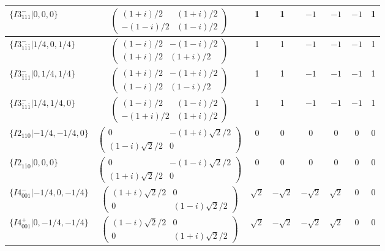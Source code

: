 \documentclass[3p,preprint]{elsarticle}
\begin{document}
\begin{table}[H]
{\begin{tabular}{|l|c||c|c|c|c|c|c|}
			$\{I3^{-}_{111}|0,0,0\}$ &		$\left(\begin{array}{cc} (1+i)/2&(1+i)/2 \\ -(1-i)/2&(1-i)/2 \end{array}\right)$	&1 & 1 & $-1$ & $-1$ & $-1$ & 1 \\ \hline
			$\{I3^{-}_{1\bar{1}\bar{1}}|1/4,0,1/4\}$ &		$\left(\begin{array}{cc} (1-i)/2&-(1-i)/2 \\ (1+i)/2&(1+i)/2 \end{array}\right)$	&1 & 1 & $-1$ & $-1$ & $-1$ & 1 \\ \hline
			$\{I3^{-}_{\bar{1}\bar{1}1}|0,1/4,1/4\}$ &		$\left(\begin{array}{cc} (1+i)/2&-(1+i)/2 \\ (1-i)/2&(1-i)/2 \end{array}\right)$	&1 & 1 & $-1$ & $-1$ & $-1$ & 1 \\ \hline
			$\{I3^{-}_{\bar{1}1\bar{1}}|1/4,1/4,0\}$ &		$\left(\begin{array}{cc} (1-i)/2&(1-i)/2 \\ -(1+i)/2&(1+i)/2 \end{array}\right)$	&1 & 1 & $-1$ & $-1$ & $-1$ & 1 \\ \hline
			$\{I2_{110}|-1/4,-1/4,0\}$ &		$\left(\begin{array}{cc} 0&-(1+i)\sqrt{2}/2 \\ (1-i)\sqrt{2}/2&0 \end{array}\right)$	&$0$ & $0$ & $0$ & $0$ & $0$ & $0$ \\ \hline
			$\{I2_{1\bar{1}0}|0,0,0\}$ &		$\left(\begin{array}{cc} 0&-(1-i)\sqrt{2}/2 \\ (1+i)\sqrt{2}/2&0 \end{array}\right)$	&$0$ & $0$ & $0$ & $0$ & $0$ & $0$ \\ \hline
			$\{I4^{-}_{001}|-1/4,0,-1/4\}$ &		$\left(\begin{array}{cc} (1+i)\sqrt{2}/2&0 \\ 0&(1-i)\sqrt{2}/2 \end{array}\right)$	&$\sqrt{2}$ & $-\sqrt{2}$ & $-\sqrt{2}$ & $\sqrt{2}$ & $0$ & $0$ \\ \hline
			$\{I4^{+}_{001}|0,-1/4,-1/4\}$ &		$\left(\begin{array}{cc} (1-i)\sqrt{2}/2&0 \\ 0&(1+i)\sqrt{2}/2 \end{array}\right)$	&$\sqrt{2}$ & $-\sqrt{2}$ & $-\sqrt{2}$ & $\sqrt{2}$ & $0$ & $0$ \\ \hline

\end{tabular}}
\end{table}
\end{document}
